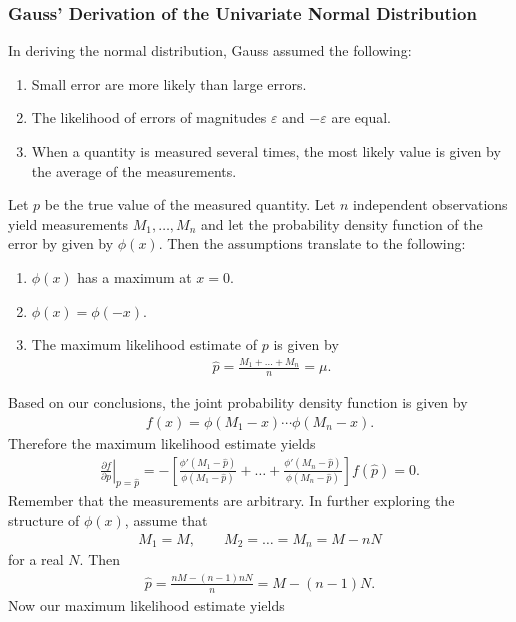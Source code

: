 \documentclass{memoir}
\begin{document}
\subsubsection{Gauss' Derivation of the Univariate Normal Distribution}
In deriving the normal distribution, Gauss assumed the following:
\begin{enumerate}
    \item Small error are more likely than large errors.
    \item The likelihood of errors of magnitudes $\varepsilon$ and $-\varepsilon$ are equal.
    \item When a quantity is measured several times, the most likely value is given by the average of the measurements.
\end{enumerate}
Let $p$ be the true value of the measured quantity. Let $n$ independent observations yield measurements $M_1,\ldots,M_n$ and let the probability density function of the error by given by $\phi(x)$. Then the assumptions translate to the following:
\begin{enumerate}
    \item $\phi(x)$ has a maximum at $x=0$.
    \item $\phi(x)=\phi(-x)$.
    \item The maximum likelihood estimate of $p$ is given by
    \begin{align*}
        \hat{p} = \frac{M_1 + \ldots + M_n}{n} = \mu.
    \end{align*}
\end{enumerate}
Based on our conclusions, the joint probability density function is given by
\begin{align*}
    f(x) = \phi(M_1 - x)\cdots\phi(M_n-x).
\end{align*}
Therefore the maximum likelihood estimate yields
\begin{align*}
    \left.\frac{\partial f}{\partial p}\right|_{p=\hat{p}}=
    -\left[\frac{\phi'(M_1-\hat{p})}{\phi(M_1-\hat{p})} + \ldots + \frac{\phi'(M_n-\hat{p})}{\phi(M_n-\hat{p})}\right]f(\hat{p})=0.
\end{align*}
Remember that the measurements are arbitrary. In further exploring the structure of $\phi(x)$, assume that
\begin{align*}
    M_1 = M, \qquad M_2=\ldots=M_n=M-nN
\end{align*}
for a real $N$. Then
\begin{align*}
    \hat{p}=\frac{nM - (n-1)nN}{n} =M-(n-1)N.
\end{align*}
Now our maximum likelihood estimate yields
\end{document}

